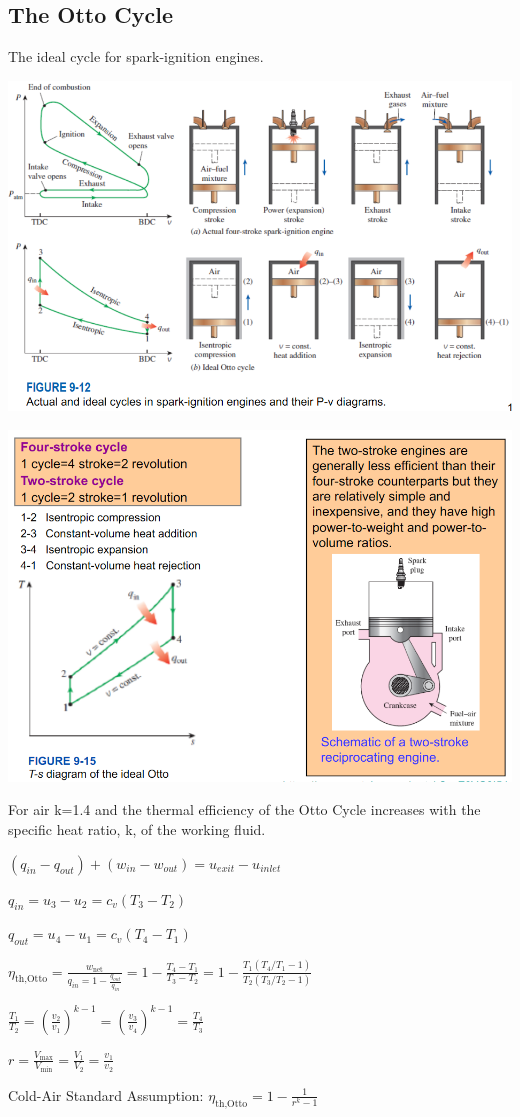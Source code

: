 \documentclass{article}
\begin{document}
\begin{multicols}{3}
    \subsection*{The Otto Cycle}
    The ideal cycle for spark-ignition engines.\par 
    \includegraphics[width=\linewidth]{Images/Otto_Cycle.png}\par
    \includegraphics[width=\linewidth]{Images/Otto_Cycle2.png}\par
    For air k=1.4 and the thermal efficiency of the Otto Cycle increases with the specific heat ratio, k, of the working fluid.\par
    $(q_{in}-q_{out})+(w_{in}-w_{out})=u_{exit}-u_{inlet}$\par 
    $q_{in}=u_3-u_2=c_v(T_3-T_2)$\par 
    $q_{out}=u_4-u_1=c_v(T_4-T_1)$\par 
    $\eta_\text{th,Otto}=\frac{w_\text{net}}{q_{in}=1-\frac{q_{out}}{q_{in}}}=1-\frac{T_4-T_1}{T_3-T_2}=1-\frac{T_1(T_4/T_1-1)}{T_2(T_3/T_2-1)}$\par 
    $\frac{T_1}{T_2}=\left(\frac{v_2}{v_1}\right)^{k-1}=\left(\frac{v_3}{v_4}\right)^{k-1}=\frac{T_4}{T_3}$\par 
    $r=\frac{V_\text{max}}{V_\text{min}}=\frac{V_1}{V_2}=\frac{v_1}{v_2}$\par 
    Cold-Air Standard Assumption: $\eta_\text{th,Otto}=1-\frac{1}{r^k-1}$

\end{multicols}
\end{document}
